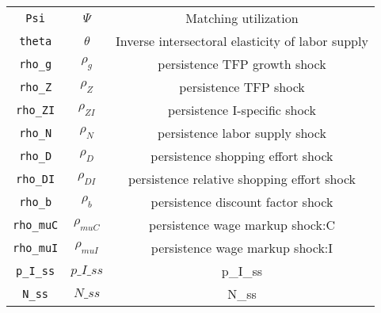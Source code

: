 \begin{center}
\begin{longtable}{ccc}
\texttt{Psi} & ${\Psi}$ & Matching utilization\\
\texttt{theta} & ${\theta}$ & Inverse intersectoral elasticity of labor supply\\
\texttt{rho\_g} & ${\rho_g}$ & persistence TFP growth shock\\
\texttt{rho\_Z} & ${\rho_Z}$ & persistence TFP shock\\
\texttt{rho\_ZI} & ${\rho_{ZI}}$ & persistence I-specific shock\\
\texttt{rho\_N} & ${\rho_N}$ & persistence labor supply shock\\
\texttt{rho\_D} & ${\rho_D}$ & persistence shopping effort shock\\
\texttt{rho\_DI} & ${\rho_{DI}}$ & persistence relative shopping effort shock\\
\texttt{rho\_b} & ${\rho_b}$ & persistence discount factor shock\\
\texttt{rho\_muC} & ${\rho_{muC}}$ & persistence wage markup shock:C\\
\texttt{rho\_muI} & ${\rho_{muI}}$ & persistence wage markup shock:I\\
\texttt{p\_I\_ss} & $p\_I\_ss$ & p\_I\_ss\\
\texttt{N\_ss} & $N\_ss$ & N\_ss\\
\hline%
\end{longtable}
\end{center}

